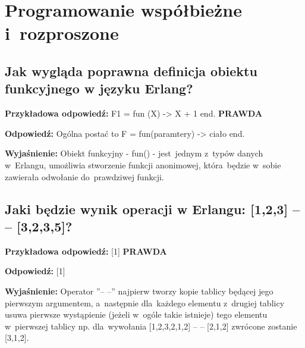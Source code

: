 \newcommand{\answerA}[5]{
\section{#1}

\noindent
{\textbf{Przykładowa odpowiedź:}}
#2
\textbf{\ifstrequal{#3}{T}{PRAWDA}{
    \ifstrequal{#3}{F}{FAŁSZ}{DIY}
}}

\vspace{0.4cm}
\noindent
\textbf{Odpowiedź:}
#4

\vspace{0.4cm}
\noindent
\textbf{Wyjaśnienie:} 
#5
}

\newcommand{\answerB}[4]{
\section{#1}

\noindent
{\textbf{Przykładowa odpowiedź:}}
#2
\textbf{\ifstrequal{#3}{T}{PRAWDA}{
    \ifstrequal{#3}{F}{FAŁSZ}{DIY}
}}

\vspace{0.4cm}
\noindent
\textbf{Odpowiedź:}
#4
}

\newcommand{\answerC}[4]{
\section{#1}

\noindent
{\textbf{Przykładowa odpowiedź:}}
#2
\textbf{\ifstrequal{#3}{T}{PRAWDA}{
    \ifstrequal{#3}{F}{FAŁSZ}{DIY}
}}

\vspace{0.4cm}
\noindent
\textbf{Wyjaśnienie:} 
#4
}

\chapter{Programowanie współbieżne i~rozproszone}
\PartialToc

\answerA
{Jak wygląda poprawna definicja obiektu funkcyjnego w języku Erlang?}
{F1 = fun (X) -> X + 1 end.}
{T}
{Ogólna postać to F = fun(paramtery) -> ciało end.}
{Obiekt funkcyjny - fun() - jest~jednym z~typów danych w~Erlangu, umożliwia stworzenie funkcji anonimowej, która~będzie w~sobie zawierała odwołanie do~prawdziwej funkcji.}

\answerA
{Jaki będzie wynik operacji w Erlangu: [1,2,3] -- -- [3,2,3,5]?}
{[1]}
{T}
{[1]}
{Operator ''-- --'' najpierw tworzy kopie tablicy będącej jego pierwszym argumentem, a~następnie dla~każdego elementu z~drugiej tablicy usuwa pierwsze wystąpienie (jeżeli w~ogóle takie istnieje) tego elementu w~pierwszej tablicy np. dla~wywołania [1,2,3,2,1,2] -- -- [2,1,2] zwrócone zostanie [3,1,2].}

